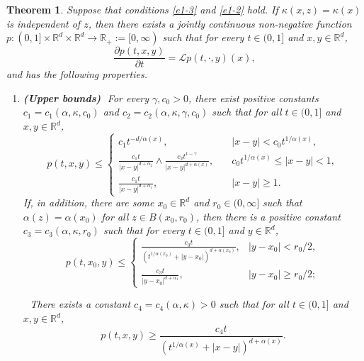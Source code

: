 \documentclass[a4paper,11pt]{amsart}
\renewcommand{\le}{\leqslant}
\renewcommand{\ge}{\geqslant}
\newcommand{\R}{\mathds R}
\newcommand{\K}{\kappa}
\newcommand{\A}{\alpha}
\newcommand{\G}{\gamma}
\def\LL{{\mathcal L}}
\newtheorem{theorem}{Theorem}[section]
\theoremstyle{definition}
\begin{document}
\begin{theorem}\label{t1-1}
Suppose that conditions \eqref{e1-3} and \eqref{e1-2}   hold. If $\K(x,z)= \kappa (x)$ is
independent of $z$,
then there exists a
  jointly continuous non-negative
function
$p:(0,1]\times \R^d
\times \R^d \rightarrow \R_+:=[0,\infty)$ such that for every $t \in (0,1]$ and $x,y \in \R^d$,
\begin{equation}\label{t1-1-1}
\frac{\partial p(t,x,y)}{\partial t}=\LL p(t,\cdot,y)(x),
\end{equation}
and has the following properties.
\begin{enumerate}
\item[(i)]{\bf (Upper bounds)}\,\,
For every $\gamma, c_0>0$, there exist positive constants $c_1 =c_1(\A,\K,c_0)$ and $c_2 =c_2(\A,\K,\G,c_0)$ such that
for all $t\in(0,1]$ and $x,y\in\R^d$,
\begin{equation}\label{t1-1-4}
p(t,x,y)\le
\begin{cases}
{c_1}{t^{-{d/\A(x)}}},&\quad |x-y|< c_0t^{{1/\A(x)}},\\
\frac{c_1t}{|x-y|^{d+\A_2}}\wedge \frac{c_2t^{1-\gamma}}{|x-y|^{d+\A(x)}},&\quad
c_0t^{{1/\A(x)}}\le |x-y|< 1,\\
\frac{c_1t}{|x-y|^{d+\A_1}},&\quad|x-y|\ge 1.
\end{cases}
\end{equation}
If, in addition,
there are some $x_0\in\R^d$ and $r_0\in(0,\infty]$ such that $\alpha(z)=\alpha(x_0)$ for all $z \in B(x_0,r_0)$,
then there is a positive constant
$c_3 =c_3(\A,\K,r_0)$ such that for every $t\in (0,1]$ and $y \in \R^d$,
\begin{equation}\label{t1-1-4a}
p(t,x_0,y)\le
\begin{cases}
\frac{c_3 t }{(t^{{1/\A(x_0)}}+|y-x_0|)^{d+\A(x_0)}},&
|y-x_0|< {r_0}/{2},\\
\frac{c_3 t }{|y-x_0|^{d+\A_1}},&|y-x_0|\ge {r_0}/{2};
\end{cases}
\end{equation}

\,\, There exists a constant $c_4 =c_4(\A,\K)>0$ such that for all $t\in(0,1]$ and $x,y\in\R^d$,
\begin{equation}\label{t1-1-4b}
p(t,x,y)\ge \frac{c_4t}{(t^{1/\A(x)}+|x-y|)^{d+\A(x)}}.
\end{equation}


\end{enumerate}
\end{theorem}
\end{document}
